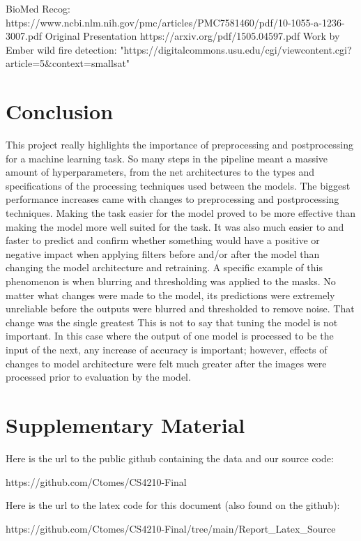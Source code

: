 \documentclass[conference]{IEEEtran}
\begin{document}
\par
BioMed Recog:
https://www.ncbi.nlm.nih.gov/pmc/articles\linebreak[0]/PMC7581460/pdf/10-1055-a-1236-3007.pdf
Original Presentation
https://arxiv.org/pdf/1505.04597.pdf
Work by Ember wild fire detection:
"https://digitalcommons.usu.edu/cgi/viewcontent.cgi?article=5\&context=smallsat"



\section{Conclusion}
This project really highlights the importance of preprocessing and postprocessing for a machine learning task. So many steps in the pipeline meant a massive amount of hyperparameters, from the net architectures to the types and specifications of the processing techniques used between the models. The biggest performance increases came with changes to preprocessing and postprocessing techniques. Making the task easier for the model proved to be more effective than making the model more well suited for the task. It was also much easier to and faster to predict and confirm whether something would have a positive or negative impact when applying filters before and/or after the model than changing the model architecture and retraining. A specific example of this phenomenon is when blurring and thresholding was applied to the masks. No matter what changes were made to the model, its predictions were extremely unreliable before the outputs were blurred and thresholded to remove noise. That change was the single greatest This is not to say that tuning the model is not important. In this case where the output of one model is processed to be the input of the next, any increase of accuracy is important; however, effects of changes to model architecture were felt much greater after the images were processed prior to evaluation by the model.

\section{Supplementary Material}
Here is the url to the public github containing the data and our source code: 
\par
https://github.com/Ctomes/CS4210-Final
\par
Here is the url to the latex code for this document (also found on the github):
\par
https://github.com/Ctomes/CS4210-Final/tree/main/Report_Latex_Source
\end{document}
